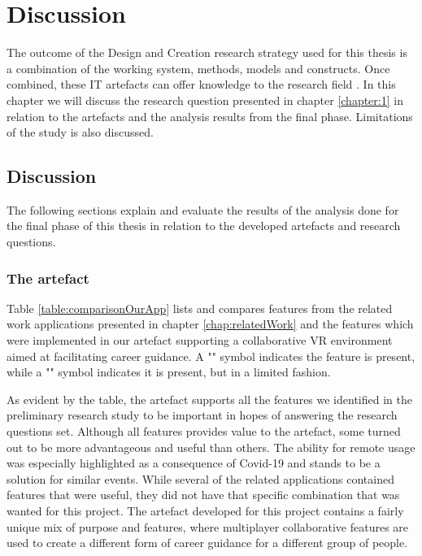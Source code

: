 
\chapter{Discussion}
The outcome of the Design and Creation research strategy used for this thesis is a combination of the working system, methods, models and constructs. Once combined, these IT artefacts can offer knowledge to the research field \cite{oates2005researching}. In this chapter we will discuss the research question presented in chapter \ref{chapter:1} in relation to the artefacts and the analysis results from the final phase. Limitations of the study is also discussed.



\section{Discussion}
The following sections explain and evaluate the results of the analysis done for the final phase of this thesis in relation to the developed artefacts and research questions.

\subsection{The artefact} 
Table \ref{table:comparisonOurApp} lists and compares features from the related work applications presented in chapter \ref{chap:relatedWork} and the features which were implemented in our artefact supporting a collaborative VR environment aimed at facilitating career guidance. A "\ON" symbol indicates the feature is present, while a "\LIM" symbol indicates it is present, but in a limited fashion.

As evident by the table, the artefact supports all the features we identified in the preliminary research study to be important in hopes of answering the research questions set. Although all features provides value to the artefact, some turned out to be more advantageous and useful than others. The ability for remote usage was especially highlighted as a consequence of Covid-19 and stands to be a solution for similar events. While several of the related applications contained features that were useful, they did not have that specific combination that was wanted for this project. The artefact developed for this project contains a fairly unique mix of purpose and features, where multiplayer collaborative features are used to create a different form of career guidance for a different group of people. 

